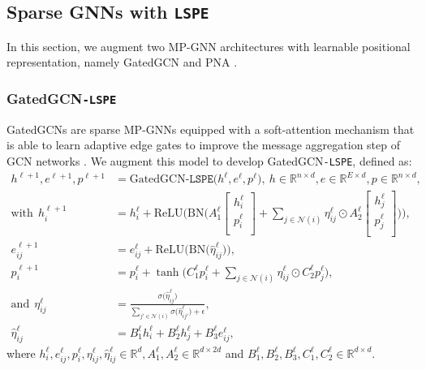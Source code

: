 \documentclass{article} \usepackage{iclr2021_conference,times}
\begin{document}
\subsection{Sparse GNNs with \texttt{LSPE}}
\label{sec:sparse_gnns_lspe}
In this section, we augment two MP-GNN architectures with learnable positional representation, namely GatedGCN \citep{bresson2017residual} and PNA \citep{corso2020principal}.


\subsubsection{GatedGCN\texttt{-LSPE}}
\label{sec:gatedgcn_lspe}
GatedGCNs \citep{bresson2017residual} are sparse MP-GNNs equipped with a soft-attention mechanism that is able to learn adaptive edge gates to improve the message aggregation step of GCN networks \citep{kipf2017semi}.  We augment this model to develop GatedGCN\texttt{-LSPE}, defined as:
\begin{align}
    h^{\ell+1}, e^{\ell+1}, p^{\ell+1} &= \text{GatedGCN}\texttt{-LSPE}\Big(h^{\ell}, e^{\ell}, p^{\ell}\Big), \ h\in\mathbb{R}^{n\times d}, e\in\mathbb{R}^{E\times d}, p\in\mathbb{R}^{n\times d},\\
    \text{with} \ \ h_i^{\ell+1} &= h_i^{\ell} + \text{ReLU}\Big( \text{BN} \Big( A_1^{\ell} \left[ \!\!\begin{array}{c} h_i^\ell \\ p_i^\ell \\ \end{array} \!\!\right] + \sum_{j \in \mathcal{N}(i)} \eta_{ij}^{\ell} \odot A_2^{\ell} \left[ \!\!\begin{array}{c} h_j^\ell \\ p_j^\ell \\ \end{array} \!\!\right] \Big) \Big), \label{eqn:gatedcn_lspe_1}\\
e_{ij}^{\ell+1} &= e_{ij}^{\ell} + \text{ReLU}\big(\text{BN}\big(\hat{\eta}_{ij}^{\ell}\big)\big),\label{eqn:gatedgcn_lspe_2}\\
p_i^{\ell+1} &= p_i^{\ell} + \tanh \Big( C_1^{\ell}p_i^{\ell} + \sum_{j \in \mathcal{N}(i)} \eta_{ij}^{\ell} \odot C_2^{\ell}
  p_j^{\ell} \Big), \label{eqn:gatedgcn_lspe_3}\\
\text{and} \ \ \eta_{ij}^{\ell} &= \frac{\sigma\big(\hat{\eta}_{ij}^{\ell}\big)}{ \sum_{j' \in \mathcal{N}(i)} \sigma\big(\hat{\eta}_{ij'}^{\ell}\big) + \epsilon},\\[4pt]
\hat{\eta}_{ij}^{\ell} &= B_1^{\ell}h_i^{\ell} + B_2^{\ell}h_j^{\ell} + B_3^{\ell}e_{ij}^{\ell},
\end{align}
where $h_i^{\ell}, e_{ij}^{\ell}, p_i^{\ell}, {\eta}_{ij}^{\ell}, \hat{\eta}_{ij}^{\ell} \in \mathbb{R}^{d}, A_1^{\ell}, A_2^{\ell} \in \mathbb{R}^{d \times 2d}$ and $B_1^{\ell}, B_2^{\ell}, B_3^{\ell}, C_1^{\ell}, C_2^{\ell} \in \mathbb{R}^{d \times d}$.
\end{document}
